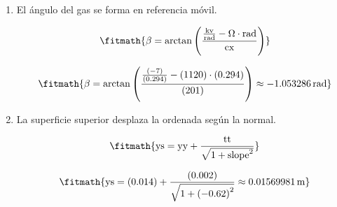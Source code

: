 \begin{enumerate}

\item El ángulo del gas se forma en referencia móvil.

\[\fitmath{\beta=\arctan\left(\frac{\frac{\mathrm{kv}}{\mathrm{rad}}-\Omega\cdot \mathrm{rad}}{\mathrm{cx}}\right)}\]

\[\fitmath{\beta=\arctan\left(\frac{\frac{(-7)}{(0.294)}-(1120)\cdot (0.294)}{(201)}\right)\approx -1.053286\,\mathrm{rad}}\]

\item La superficie superior desplaza la ordenada según la normal.

\[\fitmath{\mathrm{ys}=\mathrm{yy}+\frac{\mathrm{tt}}{\sqrt{1+{\mathrm{slope}}^{2}}}}\]

\[\fitmath{\mathrm{ys}=(0.014)+\frac{(0.002)}{\sqrt{1+{(-0.62)}^{2}}}\approx 0.01569981\,\mathrm{m}}\]

\end{enumerate}

